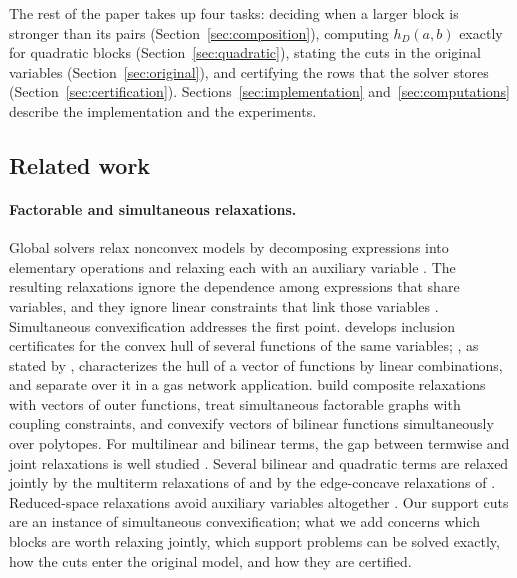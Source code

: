 The rest of the paper takes up four tasks: deciding when a larger block is
stronger than its pairs (Section~\ref{sec:composition}), computing
$h_D(a,b)$ exactly for quadratic blocks (Section~\ref{sec:quadratic}),
stating the cuts in the original variables (Section~\ref{sec:original}), and
certifying the rows that the solver stores (Section~\ref{sec:certification}).
Sections~\ref{sec:implementation} and~\ref{sec:computations} describe the
implementation and the experiments.

\subsection{Related work}\label{sec:related}

\paragraph{Factorable and simultaneous relaxations.}
Global solvers relax nonconvex models by decomposing expressions into
elementary operations and relaxing each with an auxiliary variable
\citep{McCormick1976,SmithPantelides1999,TawarmalaniSahinidis2004,BelottiEtAl2009,BestuzhevaEtAl2025}.
The resulting relaxations ignore the dependence among expressions that share
variables, and they ignore linear constraints that link those variables
\citep{ZhuHeTawarmalani2026}. Simultaneous convexification addresses the
first point. \citet{Tawarmalani2010} develops inclusion certificates for the
convex hull of several functions of the same variables;
\citet{Ballerstein2013}, as stated by \citet[Proposition~1]{LiersEtAl2021},
characterizes the hull of a vector of functions by linear combinations, and
\citet{LiersEtAl2021} separate over it in a gas network application.
\citet{HeTawarmalani2021,HeTawarmalani2022,HeTawarmalani2024} build composite
relaxations with vectors of outer functions, \citet{ZhuHeTawarmalani2026}
treat simultaneous factorable graphs with coupling constraints, and
\citet{DavarniaRichardTawarmalani2017} convexify vectors of bilinear
functions simultaneously over polytopes. For multilinear and bilinear terms,
the gap between termwise and joint relaxations is well studied
\citep{Rikun1997,LuedtkeNamazifarLinderoth2012,BolandEtAl2017,BaoKhajaviradSahinidisTawarmalani2015}.
Several bilinear and quadratic terms are relaxed jointly by the multiterm
relaxations of \citet{BaoSahinidisTawarmalani2009} and by the edge-concave
relaxations of \citet{MisenerFloudas2012}. Reduced-space relaxations avoid
auxiliary variables altogether
\citep{TsoukalasMitsos2014,BongartzMitsos2017,NajmanBongartzMitsos2021}. Our
support cuts are an instance of simultaneous convexification; what we add
concerns which blocks are worth relaxing jointly, which support problems can
be solved exactly, how the cuts enter the original model, and how they are
certified.

